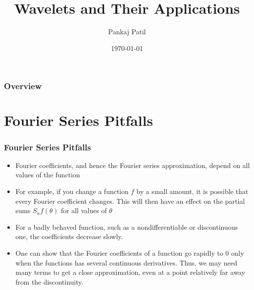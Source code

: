 \documentclass{beamer}
\title[Wavelets Applications]{Wavelets and Their Applications} %
\author{Pankaj Patil} %
\institute[UOFT] %
{
University of Toronto \\ %
\medskip
\textit{pankaj.patil@mail.utoronto.ca} %
}
\date{\today} %
\begin{document}
\begin{frame}
\titlepage %
\end{frame}

\begin{frame}
\frametitle{Overview} %
\tableofcontents %
\end{frame}


\section{Fourier Series Pitfalls} %

\begin{frame}
\frametitle{Fourier Series Pitfalls}

\begin{itemize}
    \item Fourier coefficients, and hence the Fourier series approximation, depend on all values of the function
    \item For example, if you change a function $f$ by a small amount, it is possible that every Fourier coefficient changes. This will then have an effect on the partial sums $S_n f (\theta )$ for all values of $\theta$
    \item For a badly behaved function, such as a nondifferentiable or discontinuous one, the coefficients decrease slowly.
    \item One can show that the Fourier coefficients of a function go rapidly to 0 only when the functions has several continuous derivatives. Thus, we may need many terms to get a close approximation, even at a point relatively far away from the discontinuity.
\end{itemize}

\end{frame}
\end{document}
